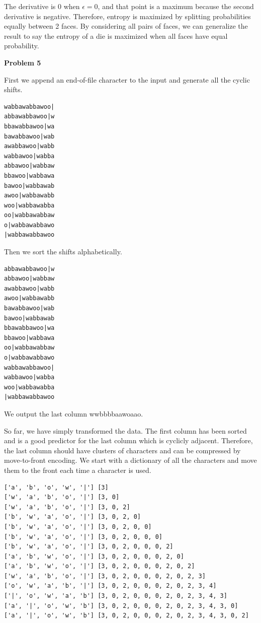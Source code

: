 \documentclass[11pt]{article}
\begin{document}
The derivative is 0 when $\epsilon = 0$, and that point is a maximum because the second derivative is negative.  Therefore, entropy is maximized by splitting probabilities equally between 2 faces.  By considering all pairs of faces, we can generalize the result to say the entropy of a die is maximized when all faces have equal probability.

\pagebreak

\noindent \textbf{Problem 5}

First we append an end-of-file character to the input and generate all the cyclic shifts.

\begin{verbatim}
wabbawabbawoo|
abbawabbawoo|w
bbawabbawoo|wa
bawabbawoo|wab
awabbawoo|wabb
wabbawoo|wabba
abbawoo|wabbaw
bbawoo|wabbawa
bawoo|wabbawab
awoo|wabbawabb
woo|wabbawabba
oo|wabbawabbaw
o|wabbawabbawo
|wabbawabbawoo
\end{verbatim}

Then we sort the shifts alphabetically.

\begin{verbatim}
abbawabbawoo|w
abbawoo|wabbaw
awabbawoo|wabb
awoo|wabbawabb
bawabbawoo|wab
bawoo|wabbawab
bbawabbawoo|wa
bbawoo|wabbawa
oo|wabbawabbaw
o|wabbawabbawo
wabbawabbawoo|
wabbawoo|wabba
woo|wabbawabba
|wabbawabbawoo
\end{verbatim}

We output the last column wwbbbbaawo\textpipe aao.

So far, we have simply transformed the data.  The first column has been sorted and is a good predictor for the last column which is cyclicly adjacent.  Therefore, the last column should have clusters of characters and can be compressed by move-to-front encoding.  We start with a dictionary of all the characters and move them to the front each time a character is used.

\begin{verbatim}
['a', 'b', 'o', 'w', '|'] [3]
['w', 'a', 'b', 'o', '|'] [3, 0]
['w', 'a', 'b', 'o', '|'] [3, 0, 2]
['b', 'w', 'a', 'o', '|'] [3, 0, 2, 0]
['b', 'w', 'a', 'o', '|'] [3, 0, 2, 0, 0]
['b', 'w', 'a', 'o', '|'] [3, 0, 2, 0, 0, 0]
['b', 'w', 'a', 'o', '|'] [3, 0, 2, 0, 0, 0, 2]
['a', 'b', 'w', 'o', '|'] [3, 0, 2, 0, 0, 0, 2, 0]
['a', 'b', 'w', 'o', '|'] [3, 0, 2, 0, 0, 0, 2, 0, 2]
['w', 'a', 'b', 'o', '|'] [3, 0, 2, 0, 0, 0, 2, 0, 2, 3]
['o', 'w', 'a', 'b', '|'] [3, 0, 2, 0, 0, 0, 2, 0, 2, 3, 4]
['|', 'o', 'w', 'a', 'b'] [3, 0, 2, 0, 0, 0, 2, 0, 2, 3, 4, 3]
['a', '|', 'o', 'w', 'b'] [3, 0, 2, 0, 0, 0, 2, 0, 2, 3, 4, 3, 0]
['a', '|', 'o', 'w', 'b'] [3, 0, 2, 0, 0, 0, 2, 0, 2, 3, 4, 3, 0, 2]
\end{verbatim}
\end{document}
